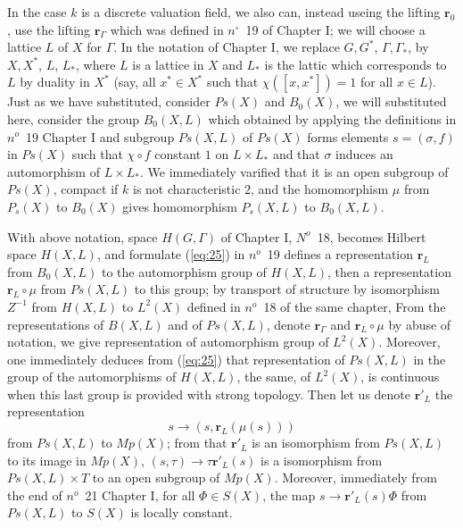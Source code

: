 \documentclass[12pt]{amsart}
\def\br{{\mathbf{r}}}
\newcounter{ssection}
\renewcommand{\subsection}{
  \addtocounter{ssection}{1}{\bf  \arabic{ssection}.\  }}
\begin{document}
\subsection{}
 In the case $k$ is a discrete valuation field,
we also can, instead useing the lifting $\br_0$, 
use the lifting $\br_\Gamma$ which was defined in $n^\circ$~19 of Chapter I;
we will choose a lattice $L$ of $X$ for $\Gamma$. In the notation of Chapter I, 
we replace $G, G^*$, 
$\Gamma, \Gamma_*$, by $X, X^*$, $L$, $L_*$, where $L$ is a lattice in $X$ and $L_*$
is the lattic which corresponds to $L$ by duality in $X^*$
(say, all $x^*\in X^*$ such that $\chi([x, x^*]) =1$ for all $x\in L$).
Just as we have substituted,  consider $Ps(X)$ and $B_0(X)$,
we will substituted here, consider the group $B_0(X, L)$ 
which obtained by applying the definitions in $n^o$~19 Chapter I and 
subgroup $Ps(X, L)$ of $Ps(X)$ forms elements $s=(\sigma, f)$ in $Ps(X)$
such that $\chi\circ f$ constant $1$ on $L\times L_*$ and that $\sigma$
induces an automorphism of $L\times L_*$. 
We immediately varified that it is an open subgroup of $Ps(X)$,
compact if $k$ is not characteristic $2$,
and the homomorphism $\mu$ from $P_s(X)$ to $B_0(X)$
 gives homomorphism $P_s(X, L)$ to $B_0(X, L)$. 

With above notation, space $H(G,\Gamma)$ of Chapter I, $N^o$~18, 
becomes Hilbert space $H(X,L)$, and formulate (\ref{eq:25})
in $n^o$~19  defines a representation $\br_L$ from $B_0(X,L)$ to 
the automorphism group of $H(X,L)$, then a representation 
$\br_L\circ \mu$ from $Ps(X, L)$ to this group;
by transport of structure by isomorphism 
$Z^{-1}$ from $H(X,L)$ to $L^2(X)$ defined in $n^o$~18 of the same chapter,
From the representations of $B(X, L)$ and of $Ps (X, L)$, denote $\br_\Gamma$
and $\br_L\circ \mu$ by abuse of notation, we give representation of 
automorphism group of $L^2(X)$.
Moreover, one immediately deduces from (\ref{eq:25}) that 
representation of $Ps(X, L)$ in the group of the automorphisms of $H(X, L)$, 
the same, of $L^2(X)$, 
is continuous when this last group is provided with strong topology. 
Then let us denote $\br'_L$ the representation
\[
s\to (s,\br_L(\mu(s)))
\]
from $Ps(X,L)$ to $Mp(X)$;
from that $\br'_L$ is an isomorphism from $Ps(X, L)$ 
to its image in $Mp(X)$, $(s,\tau)\to \tau \br'_L(s)$ is a isomorphism from 
$Ps(X,L)\times T$ to an open subgroup of $Mp(X)$. 
Moreover, immediately from the end of  $n^o$~21  
Chapter I, for all $\Phi\in S(X)$, the map $s\to \br'_L(s)\Phi$ from $Ps(X,L)$
to $S(X)$ is locally constant.  
\end{document}
